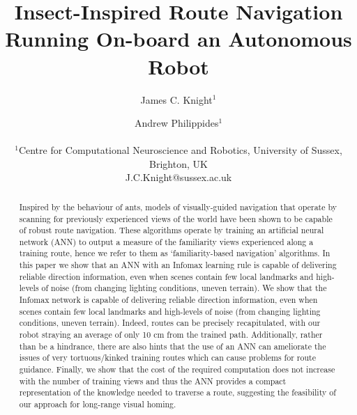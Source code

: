 \documentclass[letterpaper]{article}
\title{Insect-Inspired Route Navigation Running On-board an Autonomous Robot}
\author{James C. Knight$^{1}$ \and Andrew Philippides$^{1}$ \\
\mbox{}\\
$^1$Centre for Computational Neuroscience and Robotics, University of Sussex, Brighton, UK \\
J.C.Knight@sussex.ac.uk} %
\begin{document}
\maketitle

\begin{abstract}
Inspired by the behaviour of ants, models of visually-guided navigation that operate by scanning for previously experienced views of the world have been shown to be capable of robust route navigation. 
These algorithms operate by training an artificial neural network (ANN) to output a measure of the familiarity views experienced along a training route, hence we refer to them as ‘familiarity-based navigation’ algorithms. 
In this paper we show that an ANN with an Infomax learning rule is capable of delivering reliable direction information, even when scenes contain few local landmarks and high-levels of noise (from changing lighting conditions, uneven terrain). 
We show that the Infomax network is capable of delivering reliable direction information, even when scenes contain few local landmarks and high-levels of noise (from changing lighting conditions, uneven terrain). 
Indeed, routes can be precisely recapitulated, with our robot straying an average of only 10 cm from the trained path. 
Additionally, rather than be a hindrance, there are also hints that the use of an ANN can ameliorate the issues of very tortuous/kinked training routes which can cause problems for route guidance. 
Finally, we show that the cost of the required computation does not increase with the number of training views and thus the ANN provides a compact representation of the knowledge needed to traverse a route, suggesting the feasibility of our approach for long-range visual homing.
\end{abstract}
\end{document}
